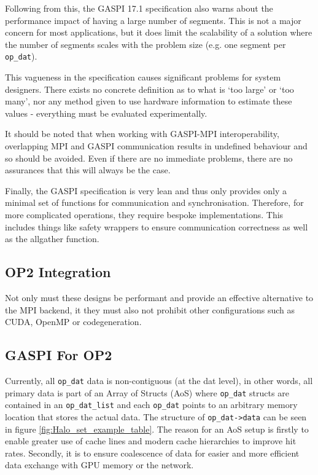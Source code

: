 
Following from this, the GASPI 17.1 specification also warns about the performance impact of having a large number of segments. This is not a major concern for most applications, but it does limit the scalability of a solution where the number of segments scales with the problem size (e.g. one segment per \texttt{op\_dat}). 

This vagueness in the specification causes significant problems for system designers. There exists no concrete definition as to what is `too large' or `too many', nor any method given to use hardware information to estimate these values - everything must be evaluated experimentally. 

It should be noted that when working with GASPI-MPI interoperability, overlapping MPI and GASPI communication results in undefined behaviour and so should be avoided. Even if there are no immediate problems, there are no assurances that this will always be the case.

Finally, the GASPI specification is very lean and thus only provides only a minimal set of functions for communication and synchronisation. Therefore, for more complicated operations, they require bespoke implementations. This includes things like safety wrappers to ensure communication correctness as well as the allgather function. 


\subsection{OP2 Integration}

Not only must these designs be performant and provide an effective alternative to the MPI backend, it they must also not prohibit other configurations such as CUDA, OpenMP or codegeneration.  



\subsection{GASPI For OP2}

Currently, all \texttt{op\_dat} data is non-contiguous (at the dat level), in other words, all primary data is part of an Array of Structs (AoS) where \texttt{op\_dat} structs are contained in an \texttt{op\_dat\_list} and each \texttt{op\_dat} points to an arbitrary memory location that stores the actual data. The structure of \texttt{op\_dat->data} can be seen in figure \ref{fig:Halo_set_example_table}. The reason for an AoS setup is firstly to enable greater use of cache lines and modern cache hierarchies to improve hit rates. Secondly, it is to ensure coalescence of data for easier and more efficient data exchange with GPU memory or the network. %

